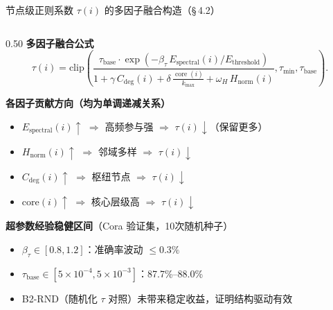 \documentclass[aspectratio=169,9pt,xcolor=dvipsnames]{beamer}
\newcommand{\highlight}[1]{\textcolor{myred}{\textbf{#1}}}
\newcommand{\blue}[1]{\textcolor{mynavy}{#1}}
\begin{document}
\begin{frame}{节点级正则系数 $\tau(i)$ 的多因子融合构造（§\,4.2）}
  \begin{columns}[T]
    \begin{column}{0.50\textwidth}
      \textbf{\blue{多因子融合公式}}
      {\small
        \begin{equation*}
          \tau(i) = \mathrm{clip}\!\left(
            \frac{\tau_{\text{base}} \cdot \exp\!\left(-\beta_{\tau}\,E_{\text{spectral}}(i)/E_{\text{threshold}}\right)}
                {1 + \gamma\,C_{\text{deg}}(i) + \delta\,\tfrac{\operatorname{core}(i)}{k_{\max}} + \omega_H\,H_{\text{norm}}(i)},
            \tau_{\min},\tau_{\text{base}}
          \right).
        \end{equation*}
      }

      \vspace{0.2cm}
      \textbf{各因子贡献方向（均为单调递减关系）}
      \begin{itemize}
        \item $E_{\mathrm{spectral}}(i)\uparrow$ $\Rightarrow$ 高频参与强 $\Rightarrow$ \highlight{$\tau(i)\downarrow$}（保留更多）
        \item $H_{\mathrm{norm}}(i)\uparrow$ $\Rightarrow$ 邻域多样 $\Rightarrow$ \highlight{$\tau(i)\downarrow$}
        \item $C_{\mathrm{deg}}(i)\uparrow$ $\Rightarrow$ 枢纽节点 $\Rightarrow$ \highlight{$\tau(i)\downarrow$}
        \item $\mathrm{core}(i)\uparrow$ $\Rightarrow$ 核心层级高 $\Rightarrow$ \highlight{$\tau(i)\downarrow$}
      \end{itemize}

      \vspace{0.2cm}
      \textbf{超参数经验稳健区间}（Cora 验证集，10次随机种子）
      \begin{itemize}
        \item $\beta_\tau\in[0.8,1.2]$：准确率波动 $\leq 0.3\%$
        \item $\tau_{\mathrm{base}}\in[5\times10^{-4},5\times10^{-3}]$：87.7\%--88.0\%
        \item B2-RND（随机化 $\tau$ 对照）未带来稳定收益，证明结构驱动有效
      \end{itemize}
    \end{column}


\end{columns}
\end{frame}
\end{document}
